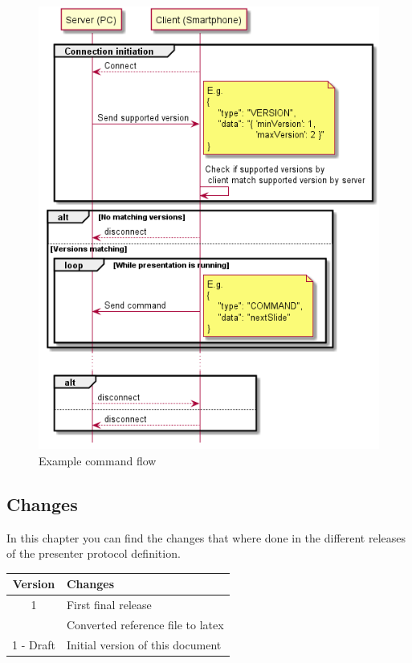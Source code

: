 \documentclass[]{article}
\begin{document}
\begin{figure}
\centering
\includegraphics{./diagrams/gen/CommandFlow.png}
\caption{Example command flow}
\label{command_flow}
\end{figure}

\printbibliography[heading=subbibliography]

\newpage

\subsection{Changes}

In this chapter you can find the changes that where done in the different releases of the presenter protocol definition.

\begin{longtable}{cl}
\toprule
Version & Changes\tabularnewline
\midrule
\endhead
1 & First final release \\
  & Converted reference file to latex\\
1 - Draft & Initial version of this document\\
\bottomrule
\end{longtable}
\end{document}
